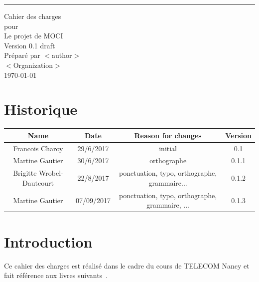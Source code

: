\documentclass{scrreprt}
\date{}
\def\myversion{0.1 }
\begin{document}
\renewcommand*{\glsclearpage}{}
\begin{flushright}
    \rule{16cm}{5pt}\vskip1cm
    \begin{bfseries}
        \Huge{Cahier des charges}\\
        \vspace{1.9cm}
        pour\\
        \vspace{1.9cm}
        Le projet de MOCI\\
        \vspace{1.9cm}
        \LARGE{Version \myversion draft}\\
        \vspace{1.9cm}
        Préparé par $<$author$>$\\
        \vspace{1.9cm}
        $<$Organization$>$\\
        \vspace{1.9cm}
        \today\\
    \end{bfseries}
\end{flushright}

\tableofcontents

\chapter*{Historique}

\begin{center}
    \begin{tabular}{|c|c|c|c|}
        \hline
	    Name & Date & Reason for changes & Version\\
        \hline
	    Francois Charoy & 29/6/2017 & initial & 0.1\\
        \hline
	    Martine Gautier & 30/6/2017 & orthographe & 0.1.1\\
        \hline
        Brigitte Wrobel-Dautcourt & 22/8/2017 & ponctuation, typo, orthographe, grammaire... & 0.1.2\\
        \hline
        Martine Gautier & 07/09/2017 & ponctuation, typo, orthographe, grammaire, ... & 0.1.3\\
        \hline
    \end{tabular}
\end{center}

\chapter{Introduction}
Ce cahier des charges est réalisé dans le cadre du cours de TELECOM Nancy  et fait référence aux livres suivants~\cite{Sommerville:2010:SE:1841764,Pohl:2010:REF:1869735,Rumbaugh:2004:UML:993859}.
\end{document}
